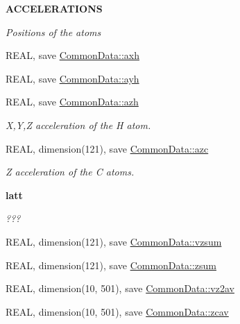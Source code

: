 \begin{Indent}{\bf ACCELERATIONS}\par
{\em \label{_amgrpa5fdc1668c426cc06df5727a473ad21c}
Positions of the atoms }\begin{DoxyCompactItemize}
\item 
REAL, save \hyperlink{namespace_common_data_a92452d88a25f1d941bd33406eb4219ee}{CommonData::axh}
\item 
REAL, save \hyperlink{namespace_common_data_a4256419c9e9f412bf3d0f5984841a834}{CommonData::ayh}
\item 
REAL, save \hyperlink{namespace_common_data_ad7ceb7c20d99e27c42aa1b1d3b579262}{CommonData::azh}
\begin{DoxyCompactList}\small\item\em X,Y,Z acceleration of the H atom. \item\end{DoxyCompactList}\item 
REAL, dimension(121), save \hyperlink{namespace_common_data_a500e1c90c8246eced8ce0a8338de0c84}{CommonData::azc}
\begin{DoxyCompactList}\small\item\em Z acceleration of the C atoms. \item\end{DoxyCompactList}\end{DoxyCompactItemize}
\end{Indent}
\begin{Indent}{\bf latt}\par
{\em \label{_amgrp5d1e6bead47fd4265bb6143ccbade00a}
??? }\begin{DoxyCompactItemize}
\item 
REAL, dimension(121), save \hyperlink{namespace_common_data_a3c7cb8fe8980c16677d67a91d4253347}{CommonData::vzsum}
\item 
REAL, dimension(121), save \hyperlink{namespace_common_data_a0ce423b52c02935927c0328fb2a8a869}{CommonData::zsum}
\item 
REAL, dimension(10, 501), save \hyperlink{namespace_common_data_a98fb8e9102a9fe8002bca31265299a9a}{CommonData::vz2av}
\item 
REAL, dimension(10, 501), save \hyperlink{namespace_common_data_a9ab21d0d353de9bb788831e27d9a5130}{CommonData::zcav}
\end{DoxyCompactItemize}
\end{Indent}
